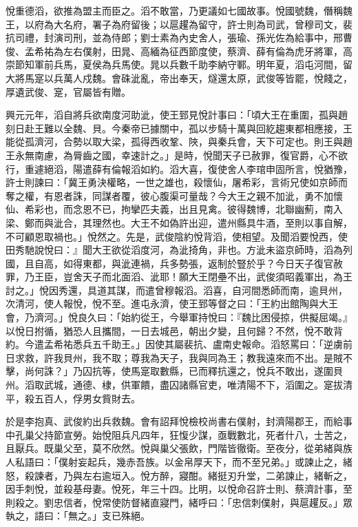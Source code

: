 \begin{pinyinscope}
 悅重德滔，欲推為盟主而臣之。滔不敢當，乃更議如七國故事。悅國號魏，僭稱魏王，以府為大名府，署子為府留後；以扈趯為留守，許士則為司武，曾穆司文，裴抗司禮，封演司刑，並為侍郎；劉士素為內史舍人，張瑜、孫光佐為給事中，邢曹俊、孟希祐為左右僕射，田晁、高緬為征西節度使，蔡濟、薛有倫為虎牙將軍，高崇節知軍前兵馬，夏侯為兵馬使。晁以兵數千助李納守鄆。明年夏，滔屯河間，留大將馬寔以兵萬人戍魏。會硃泚亂，帝出奉天，燧還太原，武俊等皆罷，悅餞之，厚遺武俊、寔，官屬皆有贈。



 興元元年，滔自將兵欲南度河助泚，使王郅見悅計事曰：「頃大王在重圍，孤與趙刻日赴王難以全魏、貝。今秦帝已據關中，孤以步騎十萬與回紇趨東都相應接，王能從孤濟河，合勢以取大梁，孤得西收鞏、陜，與秦兵會，天下可定也。則王與趙王永無南慮，為脣齒之國，幸速計之。」是時，悅聞天子已赦罪，復官爵，心不欲行，重遽絕滔，陽遣薛有倫報滔如約。滔大喜，復使舍人李琯申固所言，悅猶豫，許士則諫曰：「冀王勇決權略，一世之雄也，殺懷仙，屠希彩，言術兄使如京師而奪之權，有恩者誅，同謀者覆，彼心腹渠可量哉？今大王之親不加泚，勇不加懷仙、希彩也，而念恩不已，拘攣匹夫義，出且見禽。彼得魏博，北聯幽薊，南入梁、鄭而與泚合，其理然也。大王不如偽許出迎，遣州縣具牛酒，至則以事自解，不可顧恩取禍也。」悅然之。先是，武俊陰約悅背滔，使相望。及聞滔要悅西，使田秀馳說悅曰：』聞大王欲從滔度河，為泚掎角，非也。方泚未盜京師時，滔為列國，且自高，如得東都，與泚連禍，兵多勢張，返制於豎於乎？今日天子復官赦罪，乃王臣，豈舍天子而北面滔、泚耶！願大王閉壘不出，武俊須昭義軍出，為王討之。」悅因秀還，具道其謀，而遣曾穆報滔。滔喜，自河間悉師而南，逾貝州，次清河，使人報悅，悅不至。進屯永濟，使王郅等督之曰：「王約出館陶與大王會，乃濟河。」悅良久曰：「始約從王，今舉軍持悅曰：『魏比困侵掠，供擬屈竭。』以悅日拊循，猶恐人且攜間，一日去城邑，朝出夕變，且何歸？不然，悅不敢背約。今遣孟希祐悉兵五千助王。」因使其屬裴抗、盧南史報命。滔怒罵曰：「逆虜前日求救，許我貝州，我不取；尊我為天子，我與同為王；教我遠來而不出。是賊不擊，尚何誅？」乃囚抗等，使馬寔取數縣，已而釋抗還之，悅兵不敢出，遂圍貝州。滔取武城，通德、棣，供軍饋，盡囚諸縣官吏，唯清陽不下，滔圍之。寔拔清平，殺五百人，俘男女貲財去。



 於是李抱真、武俊約出兵救魏。會有詔拜悅檢校尚書右僕射，封濟陽郡王，而給事中孔巢父持節宣勞。始悅阻兵凡四年，狂愎少謀，亟戰數北，死者什八，士苦之，且厭兵。既巢父至，莫不欣然。悅與巢父張飲，門階皆徹衛。至夜分，從弟緒與族人私語曰：「僕射妄起兵，幾赤吾族。以金帛厚天下，而不至兄弟。」或諫止之，緒怒，殺諫者，乃與左右逾垣入。悅方醉，寢酣。緒挺刃升堂，二弟諫止，緒斬之，因手刺悅，並殺基母妻。悅死，年三十四。比明，以悅命召許士則、蔡濟計事，至則殺之。劉忠信者，悅常使防督緒直寢門，緒呼曰：「忠信刺僕射，與扈趯反。」眾執之，語曰：「無之。」支已殊絕。




\end{pinyinscope}
